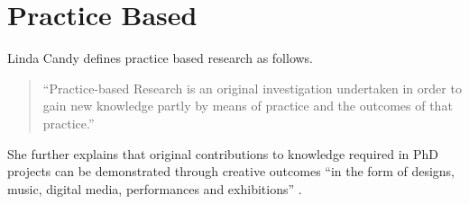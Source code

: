 \section{Practice Based}

Linda Candy defines practice based research as follows.

\begin{quote}
  ``Practice-based Research is an original investigation undertaken in order to gain new knowledge partly by means of practice and the outcomes of that practice.'' \autocite{Candy2006}
\end{quote}

She further explains that original contributions to knowledge required in PhD projects can be demonstrated through creative outcomes ``in the form of designs, music, digital media, performances and exhibitions'' \autocite{Candy2006}.





